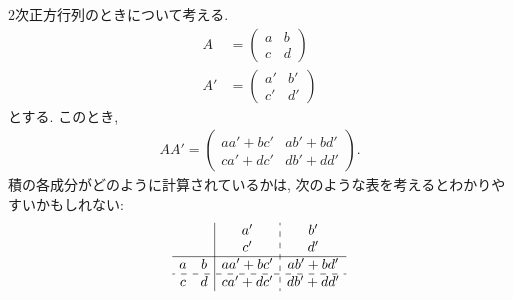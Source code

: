 \begin{example}
$2$次正方行列のときについて考える.
  \begin{align*}
  A&=
  \begin{pmatrix}
    a&b\\c&d
  \end{pmatrix}\\
  A'&=
  \begin{pmatrix}
    a'&b'\\c'&d'
  \end{pmatrix}
\end{align*}
とする.
このとき,
\begin{align*}
  AA'=
  \begin{pmatrix}
    aa'+bc'&ab'+bd'\\ca'+dc'&db'+dd'
  \end{pmatrix}.
\end{align*}
積の各成分がどのように計算されているかは,
次のような表を考えるとわかりやすいかもしれない:
\begin{align*}
  \begin{array}{cc|c:c}
   && a'&b'\\
    && c'&d'\\\hline
    a&b&aa'+bc'&ab'+bd'\\\hdashline
    c&d&ca'+dc'&db'+dd'
  \end{array}
\end{align*}
\end{example}



